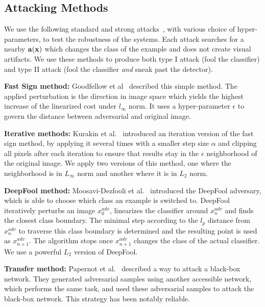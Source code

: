 \documentclass[10pt,twocolumn,letterpaper]{article}
\newcommand{\vect}[1]{{\bf {#1}}}
\begin{document}
\subsection{Attacking Methods}

We use the following standard and strong attacks~\cite{carlini2016defensive}, with various choice of
hyper-parameters, to test the robustness of the systems. Each attack searches for a nearby $\vect{a}(\vect{x})$ which 
changes the class of the example and does not create visual artifacts. We use
these methods to produce both type I attack (fool the classifier) and type II attack (fool the classifier {\em and} sneak past the
detector).

\textbf{Fast Sign method: } Goodfellow et al~\cite{goodfellow2014explaining} described this simple method. The applied perturbation is the direction in image space which yields the
highest increase of the linearized cost under $l_{\infty}$ norm. It uses a hyper-parameter $\epsilon$ to govern the 
distance between adversarial and original image. 

\textbf{Iterative methods: } Kurakin et al.~\cite{kurakin2016adversarial} introduced an iteration version of the fast
sign method, by applying it several times with a smaller step size $\alpha$ and clipping all pixels after each iteration
to ensure that results stay in the $\epsilon$ neighborhood of the original image.  We apply two versions of this method, one
where the neighborhood is in $L_\infty$ norm and another where it is in $L_2$ norm.

\textbf{DeepFool method: } Moosavi-Dezfooli et al.~\cite{moosavi2016deepfool} introduced the DeepFool adversary, which
is able to choose which class an example is switched to.  DeepFool iteratively perturbs an image $x_{0}^{adv}$, 
linearizes the classifier around $x_n^{adv}$ and finds the closest class boundary. The minimal step according to the
$l_p$ distance from $x_n^{adv}$ to traverse this class boundary is determined and the resulting point is used as
$x_{n+1}^{adv}$. The algorithm stops once $x_{n+1}^{adv}$ changes the class of the actual classifier.   We use a powerful $L_2$
version of DeepFool.

\textbf{Transfer method: } Papernot et al.~\cite{papernot2016practical} described a way to attack a black-box
network. They generated adversarial samples using another accessible network, which performs the same task, and used
these adversarial samples to attack the black-box network. This strategy has been notably reliable.  
\end{document}
